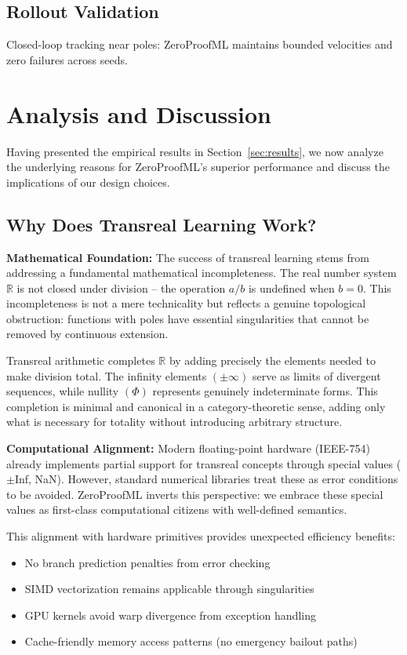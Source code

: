 \documentclass[twoside,11pt]{article}
\begin{document}
\subsection{Rollout Validation}
Closed-loop tracking near poles: ZeroProofML maintains bounded velocities and zero failures across seeds.

\section{Analysis and Discussion}
\label{sec:analysis}
Having presented the empirical results in Section~\ref{sec:results}, we now analyze the underlying reasons for ZeroProofML's superior performance and discuss the implications of our design choices.

\subsection{Why Does Transreal Learning Work?}

\textbf{Mathematical Foundation:} The success of transreal learning stems from addressing a fundamental mathematical incompleteness. The real number system $\mathbb{R}$ is not closed under division -- the operation $a/b$ is undefined when $b=0$. This incompleteness is not a mere technicality but reflects a genuine topological obstruction: functions with poles have essential singularities that cannot be removed by continuous extension.

Transreal arithmetic completes $\mathbb{R}$ by adding precisely the elements needed to make division total. The infinity elements $(\pm\infty)$ serve as limits of divergent sequences, while nullity $(\Phi)$ represents genuinely indeterminate forms. This completion is minimal and canonical in a category-theoretic sense, adding only what is necessary for totality without introducing arbitrary structure.

\textbf{Computational Alignment:} Modern floating-point hardware (IEEE-754) already implements partial support for transreal concepts through special values ($\pm$Inf, NaN). However, standard numerical libraries treat these as error conditions to be avoided. ZeroProofML inverts this perspective: we embrace these special values as first-class computational citizens with well-defined semantics.

This alignment with hardware primitives provides unexpected efficiency benefits:
\begin{itemize}
\item No branch prediction penalties from error checking
\item SIMD vectorization remains applicable through singularities
\item GPU kernels avoid warp divergence from exception handling
\item Cache-friendly memory access patterns (no emergency bailout paths)
\end{itemize}
\end{document}
